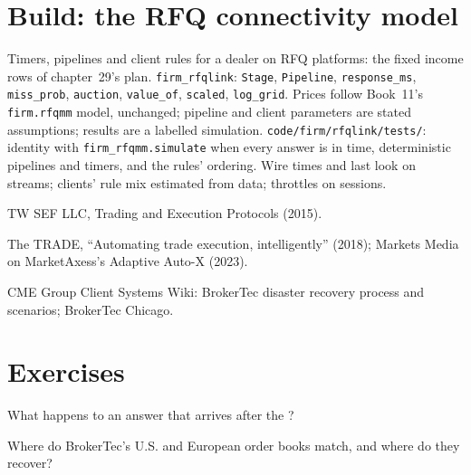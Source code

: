 \section{Build: the RFQ connectivity model}\label{bld:nw:fixed-income-and-rfq-platform-connectivity:rfqlink}

\begin{build}
 Timers, pipelines and client rules for a dealer on RFQ platforms: the fixed income rows of chapter~29's plan.
 \texttt{firm\_rfqlink}: \texttt{Stage}, \texttt{Pipeline}, \texttt{response\_ms}, \texttt{miss\_prob},
\texttt{auction}, \texttt{value\_of}, \texttt{scaled}, \texttt{log\_grid}.
 Prices follow Book~11's \texttt{firm.rfqmm} model, unchanged; pipeline and client parameters are stated assumptions;
results are a labelled simulation.
 \texttt{code/firm/rfqlink/tests/}: identity with \texttt{firm\_rfqmm.simulate} when every answer is in time,
deterministic pipelines and timers, and the rules' ordering.
 Wire times and last look on streams; clients' rule mix estimated from data; throttles on sessions.
\end{build}

\begin{omsources}
\item TW SEF LLC, Trading and Execution Protocols (2015).
\item The TRADE, ``Automating trade execution, intelligently'' (2018); Markets Media on MarketAxess's Adaptive Auto-X (2023).
\item CME Group Client Systems Wiki: BrokerTec disaster recovery process and scenarios; BrokerTec Chicago.
\end{omsources}

\section{Exercises}

\begin{exercise}[$\star$]\label{exo:nw:fixed-income-and-rfq-platform-connectivity:1}
What happens to an answer that arrives after the ?
\end{exercise}

\begin{exercise}[$\star$]\label{exo:nw:fixed-income-and-rfq-platform-connectivity:2}
Where do BrokerTec's U.S. and European order books match, and where do they recover?
\end{exercise}

